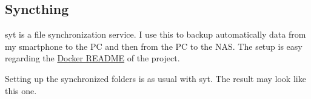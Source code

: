 

\subsection{Syncthing}

\gls{syt} is a file synchronization service. I use this to backup automatically
data from my smartphone to the PC and then from the PC to the NAS. The setup
is easy regarding the \href{https://github.com/syncthing/syncthing/blob/main/README-Docker.md}{Docker README}
of the project. 

Setting up the synchronized folders is as usual with \gls{syt}. The result
may look like this one.

